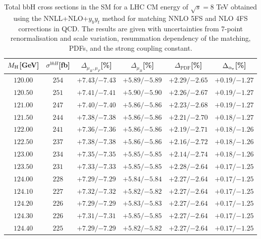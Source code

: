 \begin{table}[ht!]
\caption{Total bbH{} cross sections in the SM for a LHC CM energy of $\sqrt{s}=8$ TeV obtained using the NNLL+NLO+$y_by_t$ method for matching NNLO 5FS and NLO 4FS corrections in QCD. The results are given with uncertainties from 7-point renormalisation and scale variation, resummation dependency of the matching, PDFs, and the strong coupling constant.}
\label{tab:bbH8}
\begin{center}%
\begin{small}%
\begin{tabular}{cccccc}%
\toprule
$M_\mathrm{H}$[GeV] & $\sigma^{bbH}$[fb] & $\Delta_{\mu_{R},\mu_{F}}$[\%] & $\Delta_{\mu_{B}}$[\%] & $\Delta_{\mathrm{PDF}}$[\%] & $\Delta_{\alpha_{\mathrm{s}}}$[\%] \\
\midrule
$120.00$ & $254$ & ${+7.43}/{-7.43}$ & ${+5.89}/{-5.89}$ & ${+2.29}/{-2.65}$ & ${+0.19}/{-1.27}$ \\
$120.50$ & $251$ & ${+7.41}/{-7.41}$ & ${+5.90}/{-5.90}$ & ${+2.26}/{-2.67}$ & ${+0.19}/{-1.27}$ \\
$121.00$ & $247$ & ${+7.40}/{-7.40}$ & ${+5.86}/{-5.86}$ & ${+2.23}/{-2.68}$ & ${+0.19}/{-1.27}$ \\
$121.50$ & $244$ & ${+7.38}/{-7.38}$ & ${+5.86}/{-5.86}$ & ${+2.21}/{-2.70}$ & ${+0.18}/{-1.27}$ \\
$122.00$ & $241$ & ${+7.36}/{-7.36}$ & ${+5.86}/{-5.86}$ & ${+2.19}/{-2.71}$ & ${+0.18}/{-1.26}$ \\
$122.50$ & $237$ & ${+7.38}/{-7.38}$ & ${+5.86}/{-5.86}$ & ${+2.16}/{-2.72}$ & ${+0.18}/{-1.26}$ \\
$123.00$ & $234$ & ${+7.35}/{-7.35}$ & ${+5.85}/{-5.85}$ & ${+2.14}/{-2.74}$ & ${+0.18}/{-1.26}$ \\
$123.50$ & $231$ & ${+7.33}/{-7.33}$ & ${+5.85}/{-5.85}$ & ${+2.28}/{-2.64}$ & ${+0.17}/{-1.25}$ \\
$124.00$ & $228$ & ${+7.29}/{-7.29}$ & ${+5.84}/{-5.84}$ & ${+2.27}/{-2.64}$ & ${+0.17}/{-1.25}$ \\
$124.10$ & $227$ & ${+7.32}/{-7.32}$ & ${+5.82}/{-5.82}$ & ${+2.27}/{-2.64}$ & ${+0.17}/{-1.25}$ \\
$124.20$ & $226$ & ${+7.29}/{-7.29}$ & ${+5.83}/{-5.83}$ & ${+2.27}/{-2.64}$ & ${+0.17}/{-1.25}$ \\
$124.30$ & $226$ & ${+7.31}/{-7.31}$ & ${+5.85}/{-5.85}$ & ${+2.27}/{-2.64}$ & ${+0.17}/{-1.25}$ \\
$124.40$ & $225$ & ${+7.29}/{-7.29}$ & ${+5.82}/{-5.82}$ & ${+2.27}/{-2.64}$ & ${+0.17}/{-1.25}$ \\

\end{tabular}
\end{small}
\end{center}
\end{table}
